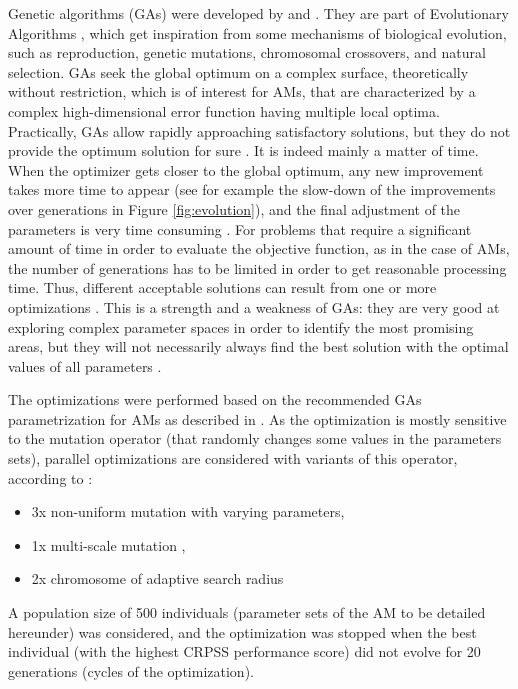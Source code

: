 \documentclass[review]{elsarticle}
\begin{document}
Genetic algorithms (GAs) were developed by \citet{Holland1992b} and \citet{Goldberg1989}. They are part of Evolutionary Algorithms \citep{Back1993b, Schwefel1993}, which get inspiration from some mechanisms of biological evolution, such as reproduction, genetic mutations, chromosomal crossovers, and natural selection. GAs seek the global optimum on a complex surface, theoretically without restriction, which is of interest for AMs, that are characterized by a complex high-dimensional error function having multiple local optima. Practically, GAs allow rapidly approaching satisfactory solutions, but they do not provide the optimum solution for sure \citep{Zitzler2004a}. It is indeed mainly a matter of time. When the optimizer gets closer to the global optimum, any new improvement takes more time to appear (see for example the slow-down of the improvements over generations in Figure \ref{fig:evolution}), and the final adjustment of the parameters is very time consuming \citep{Back1993a}. For problems that require a significant amount of time in order to evaluate the objective function, as in the case of AMs, the number of generations has to be limited in order to get reasonable processing time. Thus, different acceptable solutions can result from one or more optimizations \citep{Holland1992b}. This is a strength and a weakness of GAs: they are very good at exploring complex parameter spaces in order to identify the most promising areas, but they will not necessarily always find the best solution with the optimal values of all parameters \citep{Holland1992b}.

The optimizations were performed based on the recommended GAs parametrization for AMs as described in \citet{Horton2016}. As the optimization is mostly sensitive to the mutation operator (that randomly changes some values in the parameters sets), parallel optimizations are considered with variants of this operator, according to \citet{Horton2016}:

\begin{itemize}
	\item 3x non-uniform mutation \citep{Michalewicz1996} with varying parameters,
	\item 1x multi-scale mutation \citep{Horton2016},
	\item 2x chromosome of adaptive search radius \citep{Horton2016}
\end{itemize}

A population size of 500 individuals (parameter sets of the AM to be detailed hereunder) was considered, and the optimization was stopped when the best individual (with the highest CRPSS performance score) did not evolve for 20 generations (cycles of the optimization).
\end{document}
